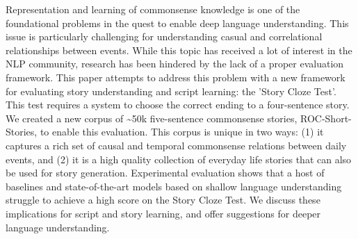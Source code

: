 Representation and learning of commonsense knowledge is one of the foundational problems in the quest to enable deep language understanding. This issue is particularly challenging for understanding casual and correlational relationships between events. While this topic has received a lot of interest in the NLP community, research has been hindered by the lack of a proper evaluation framework. This paper attempts to address this problem with a new framework for evaluating story understanding and script learning: the 'Story Cloze Test'. This test requires a system to choose the correct ending to a four-sentence story. We created a new corpus of {\textasciitilde}50k five-sentence commonsense stories, ROC-Short-Stories, to enable this evaluation. This corpus is unique in two ways: (1) it captures a rich set of causal and temporal commonsense relations between daily events, and (2) it is a high quality collection of everyday life stories that can also be used for story generation. Experimental evaluation shows that a host of baselines and state-of-the-art models based on shallow language understanding struggle to achieve a high score on the Story Cloze Test. We discuss these implications for script and story learning, and offer suggestions for deeper language understanding.
